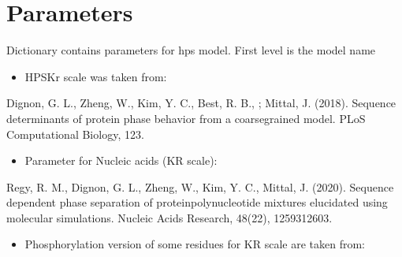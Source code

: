 \documentclass[letterpaper,10pt,english]{sphinxmanual}
\begin{document}
\begin{sphinxVerbatim}[commandchars=\\\{\}]
        
                         

                                
\end{sphinxVerbatim}

\sphinxstepscope


\chapter{Parameters}
\label{\detokenize{modules/parameters:module-hps.parameters.model_parameters}}\label{\detokenize{modules/parameters:parameters}}\label{\detokenize{modules/parameters::doc}}
\sphinxAtStartPar
Dictionary contains parameters for hps model.
First level is the model name
\begin{itemize}
\item {} 
\sphinxAtStartPar
HPS\sphinxhyphen{}Kr scale was taken from:

\end{itemize}

\sphinxAtStartPar
Dignon, G. L., Zheng, W., Kim, Y. C., Best, R. B., ; Mittal, J. (2018).
Sequence determinants of protein phase behavior from a coarse\sphinxhyphen{}grained model.
PLoS Computational Biology, 1\textendash{}23.
\begin{itemize}
\item {} 
\sphinxAtStartPar
Parameter for Nucleic acids (KR scale):

\end{itemize}

\sphinxAtStartPar
Regy, R. M., Dignon, G. L., Zheng, W., Kim, Y. C., Mittal, J. (2020).
Sequence dependent phase separation of protein\sphinxhyphen{}polynucleotide mixtures elucidated using molecular simulations.
Nucleic Acids Research, 48(22), 12593\textendash{}12603.
\begin{itemize}
\item {} 
\sphinxAtStartPar
Phosphorylation version of some residues for KR scale are taken from:

\end{itemize}
\end{document}

